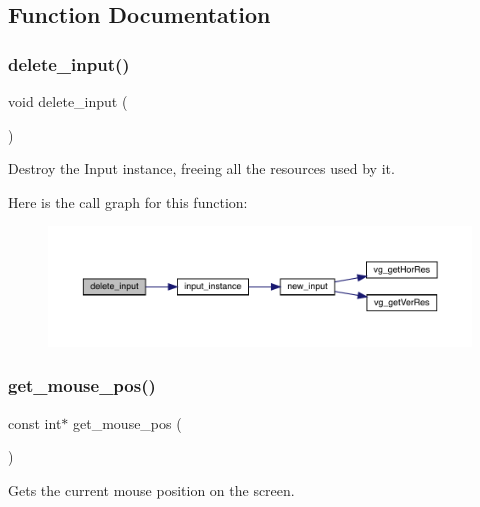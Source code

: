 \subsection{Function Documentation}
\hypertarget{group___input_ga35566b6193e5c1d1a515b309900efe82}{}\label{group___input_ga35566b6193e5c1d1a515b309900efe82} 
\subsubsection{\texorpdfstring{delete\+\_\+input()}{delete\_input()}}
{\footnotesize\ttfamily void delete\+\_\+input (\begin{DoxyParamCaption}{ }\end{DoxyParamCaption})}



Destroy the Input instance, freeing all the resources used by it. 

Here is the call graph for this function\+:\nopagebreak
\begin{figure}[H]
\begin{center}
\leavevmode
\includegraphics[width=350pt]{group___input_ga35566b6193e5c1d1a515b309900efe82_cgraph}
\end{center}
\end{figure}
\hypertarget{group___input_ga6ee316c978397c6807556fb9298ce902}{}\label{group___input_ga6ee316c978397c6807556fb9298ce902} 
\subsubsection{\texorpdfstring{get\+\_\+mouse\+\_\+pos()}{get\_mouse\_pos()}}
{\footnotesize\ttfamily const int$\ast$ get\+\_\+mouse\+\_\+pos (\begin{DoxyParamCaption}{ }\end{DoxyParamCaption})}



Gets the current mouse position on the screen. 

